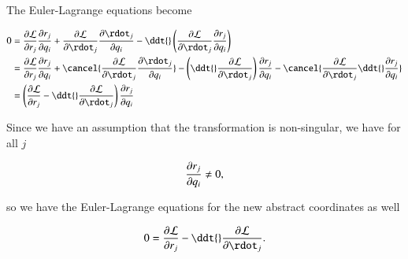 The Euler-Lagrange equations become

\begin{align*}
0 &=
\PD{r_j}{\LL} \PD{q_i}{r_j}
+\PD{\rdot_j}{\LL} \PD{q_i}{\rdot_j}
- 
\ddt{} \left(
\PD{\rdot_j}{\LL} \PD{q_i}{r_j}
\right) \\
&= 
  \PD{r_j}{\LL} \PD{q_i}{r_j}
+ \cancel{\PD{\rdot_j}{\LL} \PD{q_i}{\rdot_j}}
- \left( \ddt{} \PD{\rdot_j}{\LL} \right) \PD{q_i}{r_j}
- \cancel{\PD{\rdot_j}{\LL} \ddt{} \PD{q_i}{r_j} }
\\
&=
\left( \PD{r_j}{\LL} 
-\ddt{} \PD{\rdot_j}{\LL} 
\right) \PD{q_i}{r_j}
\end{align*}

Since we have an assumption that the transformation is non-singular, we have for all $j$ 

\begin{equation}\label{eqn:classicalMechanicsPs1:440}
\PD{q_i}{r_j} \ne 0,
\end{equation}

so we have the Euler-Lagrange equations for the new abstract coordinates as well

\begin{equation}\label{eqn:classicalMechanicsPs1:460}
0 = \PD{r_j}{\LL} -\ddt{} \PD{\rdot_j}{\LL}.
\end{equation}

\EndNoBibArticle
